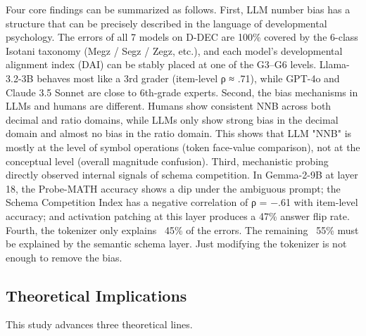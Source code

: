 Four core findings can be summarized as follows. First, LLM number bias has a structure that can be precisely described in the language of developmental psychology. The errors of all 7 models on D-DEC are 100\% covered by the 6-class Isotani\cite{isotani2010} taxonomy (Megz / Segz / Zegz, etc.), and each model's developmental alignment index (DAI) can be stably placed at one of the G3–G6 levels. Llama-3.2-3B behaves most like a 3rd grader (item-level ρ ≈ .71), while GPT-4o and Claude 3.5 Sonnet are close to 6th-grade experts. Second, the bias mechanisms in LLMs and humans are different. Humans show consistent NNB across both decimal and ratio domains, while LLMs only show strong bias in the decimal domain and almost no bias in the ratio domain. This shows that LLM "NNB" is mostly at the level of symbol operations (token face-value comparison), not at the conceptual level (overall magnitude confusion). Third, mechanistic probing directly observed internal signals of schema competition. In Gemma-2-9B at layer 18, the Probe-MATH accuracy shows a dip under the ambiguous prompt; the Schema Competition Index has a negative correlation of ρ = −.61 with item-level accuracy; and activation patching at this layer produces a 47\% answer flip rate. Fourth, the tokenizer only explains ~45\% of the errors. The remaining ~55\% must be explained by the semantic schema layer. Just modifying the tokenizer is not enough to remove the bias.

\subsection{Theoretical Implications}

This study advances three theoretical lines.

